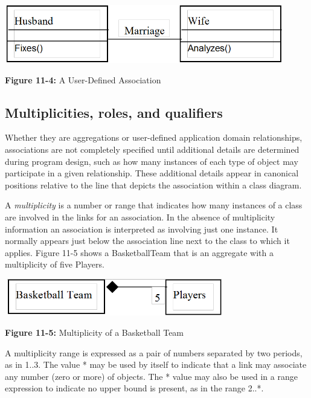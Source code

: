 \begin{center}
\includegraphics[width=4.8in,height=1.0in]{ub-img/marriage.png} 

{\sffamily\bfseries Figure 11-4:}
{\sffamily A User-Defined Association}
\end{center}

\subsection{Multiplicities, roles, and qualifiers}

Whether they are aggregations or user-defined application domain
relationships, associations are not completely specified until
additional details are determined during program design, such as how
many instances of each type of object may participate in a given
relationship. These additional details appear in canonical positions
relative to the line that depicts the association within a class
diagram.

A \textit{multiplicity} is a number or range that
indicates how many instances of a class are involved in the links for
an association. In the absence of multiplicity information an
association is interpreted as involving just one instance. It normally
appears just below the association line next to the class to which it
applies. Figure 11-5 shows a BasketballTeam that is an aggregate with a
multiplicity of five Players.

\begin{center}
\includegraphics[width=3.78in,height=0.63in]{ub-img/multipcy.png}

{\sffamily\bfseries Figure 11-5:}
{\sffamily Multiplicity of a Basketball Team}
\end{center}

A multiplicity range is expressed as a pair of numbers separated by two
periods, as in 1..3. The value * may be used by itself to indicate that
a link may associate any number (zero or more) of objects. The * value
may also be used in a range expression to indicate no upper bound is
present, as in the range 2..*.

